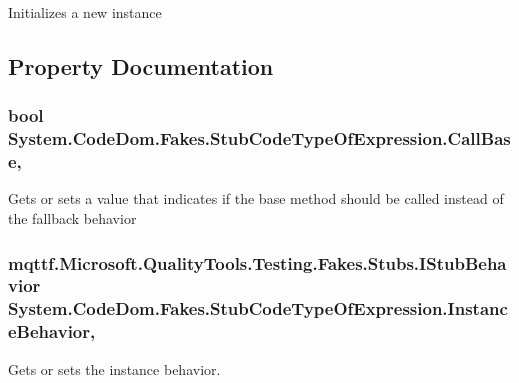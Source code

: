 Initializes a new instance



\subsection{Property Documentation}
\hypertarget{class_system_1_1_code_dom_1_1_fakes_1_1_stub_code_type_of_expression_aac4027e8a11007f59c005965f4a9784e}{
\subsubsection[{Call\-Base}]{\setlength{\rightskip}{0pt plus 5cm}bool System.\-Code\-Dom.\-Fakes.\-Stub\-Code\-Type\-Of\-Expression.\-Call\-Base\hspace{0.3cm}{\ttfamily [get]}, {\ttfamily [set]}}}\label{class_system_1_1_code_dom_1_1_fakes_1_1_stub_code_type_of_expression_aac4027e8a11007f59c005965f4a9784e}


Gets or sets a value that indicates if the base method should be called instead of the fallback behavior

\hypertarget{class_system_1_1_code_dom_1_1_fakes_1_1_stub_code_type_of_expression_aa681c5bc8977352a38bc2e1e9d7ab762}{
\subsubsection[{Instance\-Behavior}]{\setlength{\rightskip}{0pt plus 5cm}mqttf.\-Microsoft.\-Quality\-Tools.\-Testing.\-Fakes.\-Stubs.\-I\-Stub\-Behavior System.\-Code\-Dom.\-Fakes.\-Stub\-Code\-Type\-Of\-Expression.\-Instance\-Behavior\hspace{0.3cm}{\ttfamily [get]}, {\ttfamily [set]}}}\label{class_system_1_1_code_dom_1_1_fakes_1_1_stub_code_type_of_expression_aa681c5bc8977352a38bc2e1e9d7ab762}


Gets or sets the instance behavior.

